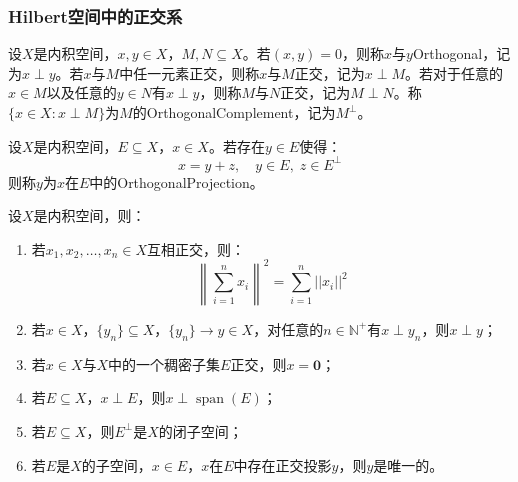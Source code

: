 \subsubsection{Hilbert空间中的正交系}
\begin{definition}
	设$X$是内积空间，$x,y\in X$，$M,N\subseteq X$。若$(x,y)=0$，则称$x$与$y$\gls{Orthogonal}，记为$x\perp y$。若$x$与$M$中任一元素正交，则称$x$与$M$正交，记为$x\perp M$。若对于任意的$x\in M$以及任意的$y\in N$有$x\perp y$，则称$M$与$N$正交，记为$M\perp N$。称$\{x\in X:x\perp M\}$为$M$的\gls{OrthogonalComplement}，记为$M^{\perp}$。
\end{definition}
\begin{definition}
	设$X$是内积空间，$E\subseteq X$，$x\in X$。若存在$y\in E$使得：
	\begin{equation*}
		x=y+z,\quad y\in E,\;z\in E^{\perp}
	\end{equation*}
	则称$y$为$x$在$E$中的\gls{OrthogonalProjection}。
\end{definition}
\begin{property}\label{prop:Orthogonal}
	设$X$是内积空间，则：
	\begin{enumerate}
		\item 若$x_1,x_2,\dots,x_n\in X$互相正交，则：
		\begin{equation*}
			\left\|\sum\limits_{i=1}^nx_i\right\|^2=\sum_{i=1}^{n}||x_i||^2
		\end{equation*}
		\item 若$x\in X$，$\{y_n\}\subseteq X$，$\{y_n\}\to y\in X$，对任意的$n\in\mathbb{N}^+$有$x\perp y_n$，则$x\perp y$；
		\item 若$x\in X$与$X$中的一个稠密子集$E$正交，则$x=\mathbf{0}$；
		\item 若$E\subseteq X$，$x\perp E$，则$x\perp\operatorname{span}(E)$；
		\item 若$E\subseteq X$，则$E^{\perp}$是$X$的闭子空间；
		\item 若$E$是$X$的子空间，$x\in E$，$x$在$E$中存在正交投影$y$，则$y$是唯一的。
	\end{enumerate}
\end{property}
